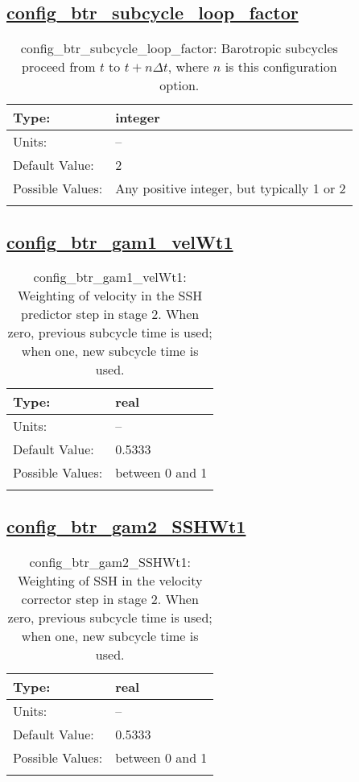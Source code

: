 \subsection[config\_btr\_subcycle\_loop\_factor]{\hyperref[sec:nm_tab_split_explicit_ts]{config\_btr\_subcycle\_loop\_factor}}
\label{subsec:nm_sec_config_btr_subcycle_loop_factor}
\begin{center}
\begin{longtable}{| p{2.0in} || p{4.0in} |}
    \hline
    Type: & integer \\
    \hline
    Units: & -- \\
    \hline
    Default Value: & 2 \\
    \hline
    Possible Values: & Any positive integer, but typically 1 or 2 \\
    \hline
    \caption{config\_btr\_subcycle\_loop\_factor: Barotropic subcycles proceed from $t$ to $t+n\Delta t$, where $n$ is this configuration option.}
\end{longtable}
\end{center}
\subsection[config\_btr\_gam1\_velWt1]{\hyperref[sec:nm_tab_split_explicit_ts]{config\_btr\_gam1\_velWt1}}
\label{subsec:nm_sec_config_btr_gam1_velWt1}
\begin{center}
\begin{longtable}{| p{2.0in} || p{4.0in} |}
    \hline
    Type: & real \\
    \hline
    Units: & -- \\
    \hline
    Default Value: & 0.5333 \\
    \hline
    Possible Values: & between 0 and 1 \\
    \hline
    \caption{config\_btr\_gam1\_velWt1: Weighting of velocity in the SSH predictor step in stage 2. When zero, previous subcycle time is used; when one, new subcycle time is used.}
\end{longtable}
\end{center}
\subsection[config\_btr\_gam2\_SSHWt1]{\hyperref[sec:nm_tab_split_explicit_ts]{config\_btr\_gam2\_SSHWt1}}
\label{subsec:nm_sec_config_btr_gam2_SSHWt1}
\begin{center}
\begin{longtable}{| p{2.0in} || p{4.0in} |}
    \hline
    Type: & real \\
    \hline
    Units: & -- \\
    \hline
    Default Value: & 0.5333 \\
    \hline
    Possible Values: & between 0 and 1 \\
    \hline
    \caption{config\_btr\_gam2\_SSHWt1: Weighting of SSH in the velocity corrector step in stage 2. When zero, previous subcycle time is used; when one, new subcycle time is used.}
\end{longtable}
\end{center}
